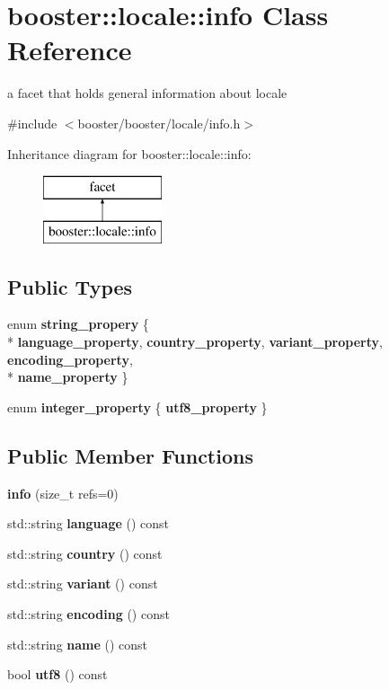 \section{booster\-:\-:locale\-:\-:info Class Reference}
\label{classbooster_1_1locale_1_1info}


a facet that holds general information about locale  




{\ttfamily \#include $<$booster/booster/locale/info.\-h$>$}

Inheritance diagram for booster\-:\-:locale\-:\-:info\-:\begin{figure}[H]
\begin{center}
\leavevmode
\includegraphics[height=2.000000cm]{classbooster_1_1locale_1_1info}
\end{center}
\end{figure}
\subsection*{Public Types}
\begin{DoxyCompactItemize}
\item 
enum {\bf string\-\_\-propery} \{ \\*
{\bf language\-\_\-property}, 
{\bf country\-\_\-property}, 
{\bf variant\-\_\-property}, 
{\bf encoding\-\_\-property}, 
\\*
{\bf name\-\_\-property}
 \}
\item 
enum {\bf integer\-\_\-property} \{ {\bf utf8\-\_\-property}
 \}
\end{DoxyCompactItemize}
\subsection*{Public Member Functions}
\begin{DoxyCompactItemize}
\item 
{\bf info} (size\-\_\-t refs=0)
\item 
std\-::string {\bf language} () const 
\item 
std\-::string {\bf country} () const 
\item 
std\-::string {\bf variant} () const 
\item 
std\-::string {\bf encoding} () const 
\item 
std\-::string {\bf name} () const 
\item 
bool {\bf utf8} () const 
\end{DoxyCompactItemize}
